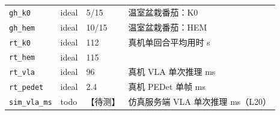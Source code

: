 \begin{longtable}{p{3.2cm}p{0.9cm}p{4.2cm}p{6.2cm}}
\texttt{gh\_k0} & ideal & 5/15 & 温室盆栽番茄：K0\\
\texttt{gh\_hem} & ideal & 10/15 & 温室盆栽番茄：HEM\\
\texttt{rt\_k0} & ideal & 112 & 真机单回合平均用时 s\\
\texttt{rt\_hem} & ideal & 115 & \\
\texttt{rt\_vla} & ideal & 96 & 真机 VLA 单次推理 ms\\
\texttt{rt\_pedet} & ideal & 2.4 & 真机 PEDet 单帧 ms\\
\texttt{sim\_vla\_ms} & todo & 【待测】 & 仿真服务端 VLA 单次推理 ms（L20）\\
\bottomrule
\end{longtable}
